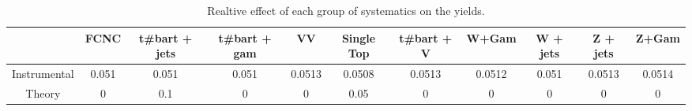\begin{table}[htbp]
\begin{center}
\begin{tabular}{|c|c|c|c|c|c|c|c|c|c|c|}
\hline 
      & FCNC      & t#bar{t} + jets      & t#bar{t} +  gam      & VV      & Single Top      & t#bar{t} + V      & W+Gam      & W + jets      & Z + jets      & Z+Gam \\ 
\hline 
 Instrumental & 0.051 & 0.051 & 0.051 & 0.0513 & 0.0508 & 0.0513 & 0.0512 & 0.051 & 0.0513 & 0.0514 \\ 
 Theory & 0 & 0.1 & 0 & 0 & 0.05 & 0 & 0 & 0 & 0 & 0 \\ 
\hline 
\end{tabular} 
\caption{Realtive effect of each group of systematics on the yields.} 
\end{center} 
\end{table} 
